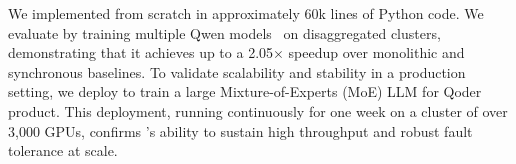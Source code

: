 We implemented \SystemName{} from scratch in approximately 60k lines of
Python code. We evaluate \SystemName{} by training multiple Qwen models~\cite
{qwen-huggingface} on disaggregated clusters, demonstrating that it achieves
up to a 2.05$\times$ speedup over monolithic and synchronous baselines. To
validate scalability and stability in a production setting, we deploy \SystemName{}
to train a large Mixture-of-Experts (MoE) LLM for Qoder~\cite{qoder} product. This
deployment, running continuously for one week on a cluster of over 3,000
GPUs, confirms \SystemName{}'s ability to sustain high throughput and robust fault
tolerance at scale.
